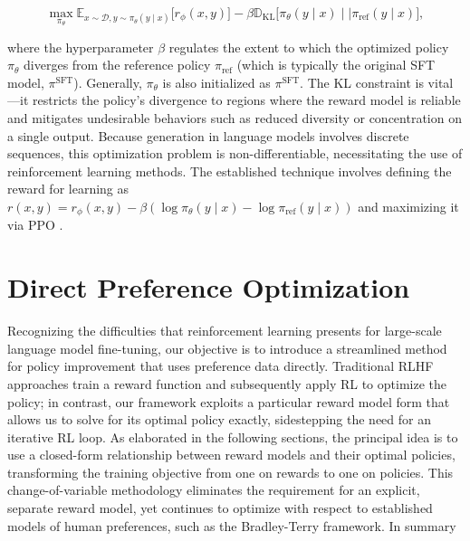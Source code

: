 \begin{equation}\label{eq:RL}
\max_{\pi_{\theta}}  \mathbb{E}_{x\sim \mathcal{D}, y\sim \pi_{\theta}(y \mid x)}\bigl[r_{\phi}(x, y)\bigr] - \beta\mathbb{D}_{\textrm{KL}}\bigl[\pi_{\theta}(y\mid x)\mid \mid \pi_\text{ref}(y\mid x)\bigr],
\end{equation}

where the hyperparameter $\beta$ regulates the extent to which the optimized policy $\pi_\theta$ diverges from the reference policy $\pi_\text{ref}$ (which is typically the original SFT model, $\pi^\text{SFT}$). Generally, $\pi_\theta$ is also initialized as $\pi^\text{SFT}$. The KL constraint is vital—it restricts the policy’s divergence to regions where the reward model is reliable and mitigates undesirable behaviors such as reduced diversity or concentration on a single output. Because generation in language models involves discrete sequences, this optimization problem is non-differentiable, necessitating the use of reinforcement learning methods. The established technique \citep{ziegler2020finetuning, stiennon2022learning, bai2022training, ouyang2022training} involves defining the reward for learning as ${r(x, y) = r_{\phi}(x, y) -\beta (\log \pi_{\theta}(y\mid x) - \log \pi_\text{ref}(y\mid x))}$ and maximizing it via PPO \cite{schulman2017proximal}. 

\section{Direct Preference Optimization}\label{sec:DPO}

Recognizing the difficulties that reinforcement learning presents for large-scale language model fine-tuning, our objective is to introduce a streamlined method for policy improvement that uses preference data directly. Traditional RLHF approaches train a reward function and subsequently apply RL to optimize the policy; in contrast, our framework exploits a particular reward model form that allows us to solve for its optimal policy exactly, sidestepping the need for an iterative RL loop. As elaborated in the following sections, the principal idea is to use a closed-form relationship between reward models and their optimal policies, transforming the training objective from one on rewards to one on policies. This change-of-variable methodology eliminates the requirement for an explicit, separate reward model, yet continues to optimize with respect to established models of human preferences, such as the Bradley-Terry framework. In summary

